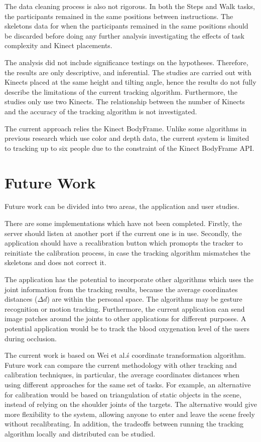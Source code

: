 The data cleaning process is also not rigorous. In both the Steps and Walk tasks, the participants remained in the same positions between instructions. The skeletons data for when the participants remained in the same positions should be discarded before doing any further analysis investigating the effects of task complexity and Kinect placements.

The analysis did not include significance testings on the hypotheses. Therefore, the results are only descriptive, and inferential. The studies are carried out with Kinects placed at the same height and tilting angle, hence the results do not fully describe the limitations of the current tracking algorithm. Furthermore, the studies only use two Kinects. The relationship between the number of Kinects and the accuracy of the tracking algorithm is not investigated.

The current approach relies the Kinect BodyFrame. Unlike some algorithms in previous research which use color and depth data, the current system is limited to tracking up to six people due to the constraint of the Kinect BodyFrame API.

\section{Future Work}
\label{sec:discussion_future_Work}

Future work can be divided into two areas, the application and user studies.

There are some implementations which have not been completed. Firstly, the server should listen at another port if the current one is in use. Secondly, the application should have a recalibration button which promopts the tracker to reinitiate the calibration process, in case the tracking algorithm mismatches the skeletons and does not correct it.

The application has the potential to incorporate other algorithms which uses the joint information from the tracking results, because the average coordinates distances ($\Delta d$) are within the personal space. The algorithms may be gesture recognition or motion tracking. Furthermore, the current application can send image patches around the joints to other applications for different purposes. A potential application would be to track the blood oxygenation level of the users during occlusion.

The current work is based on Wei et al.\'s coordinate transformation algorithm. Future work can compare the current methodology with other tracking and calibration techniques, in particular, the average coordinates distances when using different approaches for the same set of tasks. For example, an alternative for calibration would be based on triangulation of static objects in the scene, instead of relying on the shoulder joints of the targets. The alternative would give more flexibility to the system, allowing anyone to enter and leave the scene freely without recalibrating. In addition, the tradeoffs between running the tracking algorithm locally and distributed can be studied.

